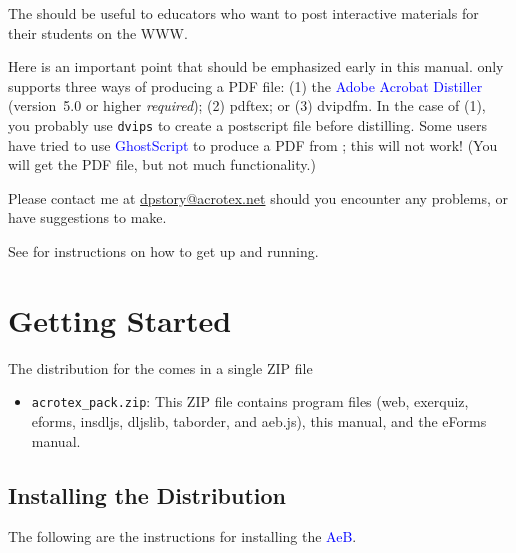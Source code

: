 \documentclass{article}
\def\AEB{\textsf{AeB}}
\def\cAEB{\textcolor{blue}{\AEB}}
\begin{document}
\noindent The \cAcroB{} should be useful to educators who want to post
interactive materials for their students on the \textsf{WWW}.

\begin{comment}
To play it safe, you should use the most recent version of
\textsf{hyperref} by Sebastian Rahtz and now Heiko Oberdiek. The
\textsf{exerquiz} package makes extensive use of forms; Adobe
Reader 3.0 with Forms 3.5 at least is needed, Adobe Reader 4.0 or
above is preferred.
\end{comment}

Here is an important point that should be emphasized early in this
manual. \cAcroT{} only supports three ways of producing a
\textsf{PDF} file: (1) the \textcolor{blue}{Adobe Acrobat
Distiller} (version~5.0 or higher \emph{required}); (2)
\textsf{pdftex}; or (3) \textsf{dvipdfm}. In the case of (1), you
probably use \texttt{dvips} to create a postscript file before
distilling. Some users have tried to use
\textcolor{blue}{GhostScript} to produce a \textsf{PDF}
from \cAcroT; this will not work! (You will get the \textsf{PDF}
file, but not much functionality.)

Please contact me at \url{dpstory@acrotex.net} should you encounter
any problems, or have suggestions to make.

\redpoint See  for instructions on how to get up
and running.

\section{Getting Started}\label{s:start}

The distribution for the {\cAcroB} comes in a single ZIP file
\begin{itemize}
  \item \texttt{acrotex\_pack.zip}: This ZIP file contains program
  files (web, exerquiz, eforms, insdljs, dljslib, taborder, and aeb.js),
  this manual, and the eForms manual.
\end{itemize}

\subsection{Installing the Distribution}

The following are the instructions for installing the \cAEB.
\end{document}
